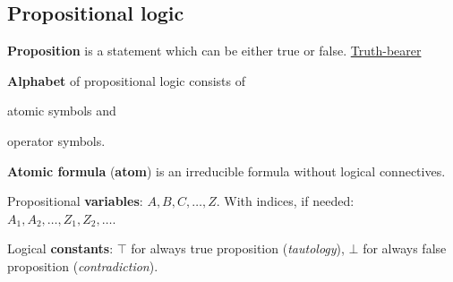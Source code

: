 \documentclass[a4paper,10pt]{article}
\begin{document}
\begin{terms}
\begin{enumerate}[left=6pt .. 18pt]
    \end{enumerate}


\end{terms}


\newpage
\subsection{Propositional logic}

\begin{terms}
    \item \textbf{Proposition} is a statement which can be either true or false.
    \hfill\href{https://en.wikipedia.org/wiki/Truth-bearer}{Truth-bearer}

    \item \textbf{Alphabet} of propositional logic consists of
    \begin{mylist}
        \item atomic symbols and
        \item operator symbols.
    \end{mylist}



    \item \textbf{Atomic formula} (\textbf{atom}) is an irreducible formula without logical connectives.
    \begin{terms}
        \item Propositional \textbf{variables}: $A, B, C, \dotsc, Z$. With indices, if needed: $A_1, A_2, \dotsc, Z_1, Z_2, \dotsc$.

        \item Logical \textbf{constants}: $\top$ for always true proposition (\textit{tautology}), $\bot$ for always false proposition (\textit{contradiction}).
    \end{terms}


\end{terms}
\end{document}
